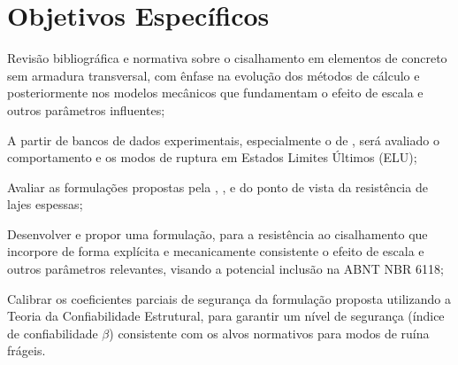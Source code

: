 \section{Objetivos Específicos}
\begin{alineas}
	\item Revisão bibliográfica e normativa sobre o cisalhamento em elementos de concreto sem armadura transversal, com ênfase na evolução dos métodos de cálculo e posteriormente nos modelos mecânicos que fundamentam o efeito de escala e outros parâmetros influentes;
	\item A partir de bancos de dados experimentais, especialmente o de \textcite{Kuchma2019}, será avaliado o comportamento e os modos de ruptura em Estados Limites Últimos (ELU);
	\item Avaliar as formulações propostas pela \textcite{NBR6118:2023}, \textcite{CEN2004}, \textcite{ACI318:2019} e \textcite{FIB:2020} do ponto de vista da resistência de lajes espessas;
	\item Desenvolver e propor uma formulação, para a resistência ao cisalhamento que incorpore de forma explícita e mecanicamente consistente o efeito de escala e outros parâmetros relevantes, visando a potencial inclusão na ABNT NBR 6118;
	\item Calibrar os coeficientes parciais de segurança da formulação proposta utilizando a Teoria da Confiabilidade Estrutural, para garantir um nível de segurança (índice de confiabilidade $\beta$) consistente com os alvos normativos para modos de ruína frágeis.
\end{alineas}	


